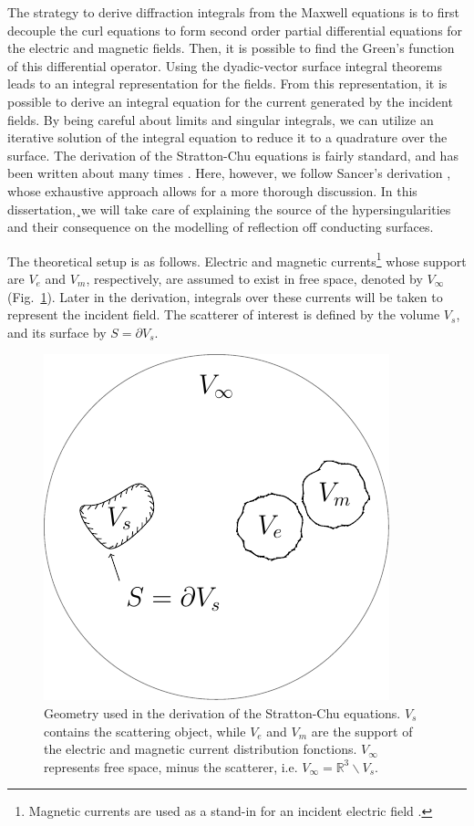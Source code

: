\documentclass[11pt,SymmetricalJury]{inrsthesis/inrsthesis}
\begin{document}
The strategy to derive diffraction integrals from the Maxwell equations is to
first decouple the curl equations to form second order partial differential
equations for the electric and magnetic fields. Then, it is possible to find the
Green's function of this differential operator. Using the dyadic-vector surface
integral theorems leads to an integral representation for the fields. From this
representation, it is possible to derive an integral equation for the current
generated by the incident fields. By being careful about limits and singular
integrals, we can utilize an iterative solution of the integral equation to
reduce it to a quadrature over the surface. The derivation of the Stratton-Chu
equations is fairly standard, and has been written about many times \cite{}.
Here, however, we follow Sancer's derivation \cite{Sancer1968}, whose exhaustive
approach allows for a more thorough discussion. In this dissertation,¸we will
take care of explaining the source of the hypersingularities and their
consequence on the modelling of reflection off conducting surfaces.

The theoretical setup is as follows. Electric and magnetic
currents\footnote{Magnetic currents are used as a stand-in for an incident
electric field \cite{Schelkunoff1936}.} whose support are $V_e$ and $V_m$,
respectively, are assumed to exist in free space, denoted by $V_\infty$
(Fig.~\ref{fig:sc.scatteringSystem}). Later in the derivation, integrals over
these currents will be taken to represent the incident field. The scatterer of
interest is defined by the volume $V_s$, and its surface by $S=\partial V_s$.

  \begin{figure}
    \centering
    \includegraphics{figs/scatteringSystem.pdf}
    \caption[Geometry used in the derivation of the Stratton-Chu equations.]
            {Geometry used in the derivation of the Stratton-Chu equations.
             $V_s$ contains the scattering object, while $V_e$ and $V_m$ are the
             support of the electric and magnetic current distribution fonctions.
             $V_\infty$ represents free space, minus the scatterer, i.e.
             $V_\infty=\mathbb{R}^3\backslash V_s$.}
    \label{fig:sc.scatteringSystem}
  \end{figure}
\end{document}
